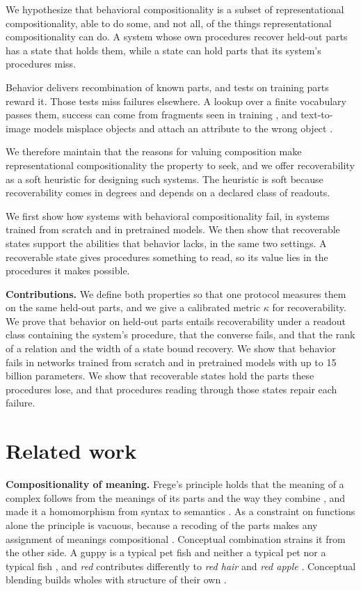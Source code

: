 \documentclass[10pt]{article}
\theoremstyle{plain}
\theoremstyle{remark}
\begin{document}
We hypothesize that behavioral compositionality is a subset of representational compositionality, able to do some, and not all, of the things representational compositionality can do. A system whose own procedures recover held-out parts has a state that holds them, while a state can hold parts that its system's procedures miss.

Behavior delivers recombination of known parts, and tests on training parts reward it. Those tests miss failures elsewhere. A lookup over a finite vocabulary passes them, success can come from fragments seen in training \citep{dziri2023}, and text-to-image models misplace objects \citep{conwell2022} and attach an attribute to the wrong object \citep{rassin2022}.

We therefore maintain that the reasons for valuing composition make representational compositionality the property to seek, and we offer recoverability as a soft heuristic for designing such systems. The heuristic is soft because recoverability comes in degrees and depends on a declared class of readouts.

We first show how systems with behavioral compositionality fail, in systems trained from scratch and in pretrained models. We then show that recoverable states support the abilities that behavior lacks, in the same two settings. A recoverable state gives procedures something to read, so its value lies in the procedures it makes possible.

\textbf{Contributions.} We define both properties so that one protocol measures them on the same held-out parts, and we give a calibrated metric $\kappa$ for recoverability. We prove that behavior on held-out parts entails recoverability under a readout class containing the system's procedure, that the converse fails, and that the rank of a relation and the width of a state bound recovery. We show that behavior fails in networks trained from scratch and in pretrained models with up to 15 billion parameters. We show that recoverable states hold the parts these procedures lose, and that procedures reading through those states repair each failure.

\section{Related work}
\label{sec:related}

\textbf{Compositionality of meaning.} Frege's principle holds that the meaning of a complex follows from the meanings of its parts and the way they combine \citep{frege1923}, and \citet{montague1970} made it a homomorphism from syntax to semantics \citep[see][]{janssen1997}. As a constraint on functions alone the principle is vacuous, because a recoding of the parts makes any assignment of meanings compositional \citep{zadrozny1994}. Conceptual combination strains it from the other side. A guppy is a typical pet fish and neither a typical pet nor a typical fish \citep{osherson1981}, and \emph{red} contributes differently to \emph{red hair} and \emph{red apple} \citep{kamp1995}. Conceptual blending builds wholes with structure of their own \citep{fauconnier2002}.
\end{document}
